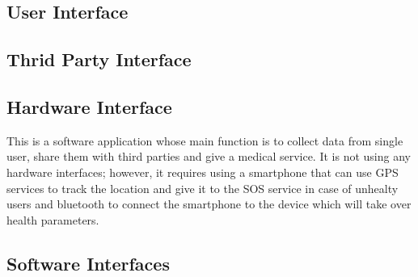 \subsection{User Interface}


\subsection{Thrid Party Interface}


\subsection{Hardware Interface}

This is a software application whose main function is to collect data from single user, share them with third parties and give a medical service. It is not using any hardware interfaces; however, it requires using a smartphone that can use GPS services to track the location and give it to the SOS service in case of unhealty users and bluetooth to connect the smartphone to the device which will take over health parameters.

\subsection{Software Interfaces}

